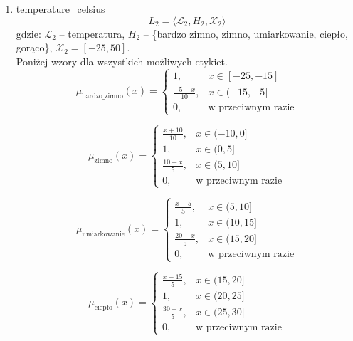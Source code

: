 \documentclass{article}
\begin{document}
\begin{enumerate}
    \item temperature\_celsius
        \begin{equation}
            L_2 = \langle \mathcal{L}_2, H_2, \mathcal{X}_2 \rangle
        \end{equation}
        gdzie: $\mathcal{L}_2$ – temperatura, $H_2$ – \{bardzo zimno, zimno, umiarkowanie, ciepło, gorąco\}, $\mathcal{X}_2 = [-25, 50]$. \\
        Poniżej wzory dla wszystkich możliwych etykiet.
                \begin{equation}
                   \mu_{\text{bardzo\_zimno}}(x) =
                    \begin{cases}
                    1, & x \in [-25, -15] \\
                    \frac{-5 - x}{10}, & x \in (-15, -5] \\
                    0, & \text{w przeciwnym razie}
                    \end{cases}
                \end{equation}
                
                \begin{equation}
                   \mu_{\text{zimno}}(x) =
                    \begin{cases}
                    \frac{x + 10}{10}, & x \in (-10, 0] \\
                    1, & x \in (0, 5] \\
                    \frac{10 - x}{5}, & x \in (5, 10] \\
                    0, & \text{w przeciwnym razie}
                    \end{cases}
                \end{equation}

                \begin{equation}
                    \mu_{\text{umiarkowanie}}(x) =
                    \begin{cases}
                    \frac{x - 5}{5}, & x \in (5, 10] \\
                    1, & x \in (10, 15] \\
                    \frac{20 - x}{5}, & x \in (15, 20] \\
                    0, & \text{w przeciwnym razie}
                    \end{cases}
                \end{equation}

                \begin{equation}
                    \mu_{\text{ciepło}}(x) =
                    \begin{cases}
                    \frac{x - 15}{5}, & x \in (15, 20] \\
                    1, & x \in (20, 25] \\
                    \frac{30 - x}{5}, & x \in (25, 30] \\
                    0, & \text{w przeciwnym razie}
                    \end{cases}
                \end{equation}


\end{enumerate}
\end{document}
